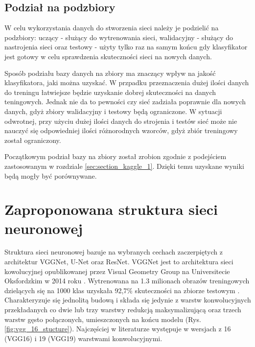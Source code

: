 \subsection{Podział na podzbiory}

W celu wykorzystania danych do stworzenia sieci należy je podzielić na podzbiory: uczący - służący do wytrenowania sieci, walidacyjny - służący do nastrojenia sieci oraz testowy - użyty tylko raz na samym końcu gdy klasyfikator jest gotowy w celu sprawdzenia skuteczności sieci na nowych danych.

{\parindent0pt
Sposób podziału bazy danych na zbiory ma znaczący wpływ na jakość klasyfikatora, jaki można uzyskać. W przpadku przeznaczenia dużej ilości danych do treningu łatwiejsze będzie uzyskanie dobrej skuteczności na danych teningowych. Jednak nie da to pewności czy sieć zadziała poprawnie dla nowych danych, gdyż zbiory walidacyjny i testowy będą ograniczone. W sytuacji odwrotnej, przy użyciu dużej ilości danych do strojenia i testów sieć może nie nauczyć się odpowiedniej ilości różnorodnych wzorców, gdyż zbiór treningowy został ograniczony.

Początkowym podział bazy na zbiory został zrobion zgodnie z podejściem zastosowanym w rozdziale \ref{sec:section_kaggle_1}. Dzięki temu uzyskane wyniki będą mogły być porównywane.
}

\section{Zaproponowana struktura sieci neuronowej}
Struktura sieci neuronowej bazuje na wybranych cechach zaczerpiętych z architektur VGGNet, U-Net oraz ResNet. VGGNet jest to architektura sieci kowolucyjnej opublikowanej przez Visual Geometry Group na Universitecie Oksfordzkim w 2014 roku \cite{VGG16_info}. Wytrenowana na 1.3 milionach obrazów treningowych dzielących się na 1000 klas uzyskała 92,7\% skuteczności na zbiorze testowym \cite{deep_learning_w_keras} \cite{VGG16_article_online}. Charakteryzuje się jednolitą budową i składa się jedynie z warstw konwolucyjnych przekładanych co dwie lub trzy warstwy redukcją maksymalizującą oraz trzech warstw gęsto połączonych, umieszczonych na końcu modelu (Rys. \ref{fig:vgg_16_stucture}). Najczęściej w literaturze występuje w wersjach z 16 (VGG16) i 19 (VGG19) warstwami konwolucyjnymi. 

